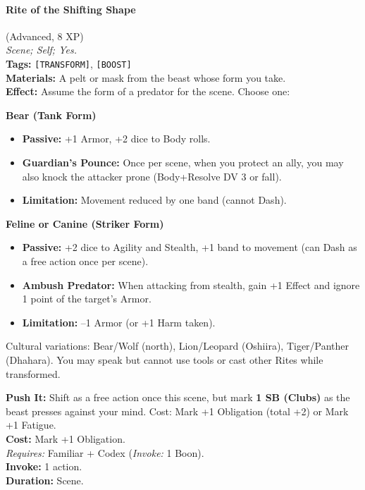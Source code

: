 \paragraph{Rite of the Shifting Shape} (Advanced, 8 XP) \hfill \\
\emph{Scene; Self; Yes.} \\
\textbf{Tags:} \texttt{[TRANSFORM]}, \texttt{[BOOST]} \\
\textbf{Materials:} A pelt or mask from the beast whose form you take. \\
\textbf{Effect:} Assume the form of a predator for the scene. Choose one:

\medskip
\noindent\textbf{Bear (Tank Form)}
\begin{itemize}
  \item \textbf{Passive:} +1 Armor, +2 dice to Body rolls.
  \item \textbf{Guardian's Pounce:} Once per scene, when you protect an ally, you may also knock the attacker prone (Body+Resolve DV 3 or fall).
  \item \textbf{Limitation:} Movement reduced by one band (cannot Dash).
\end{itemize}

\noindent\textbf{Feline or Canine (Striker Form)}
\begin{itemize}
  \item \textbf{Passive:} +2 dice to Agility and Stealth, +1 band to movement (can Dash as a free action once per scene).
  \item \textbf{Ambush Predator:} When attacking from stealth, gain +1 Effect and ignore 1 point of the target's Armor.
  \item \textbf{Limitation:} --1 Armor (or +1 Harm taken).
\end{itemize}

Cultural variations: Bear/Wolf (north), Lion/Leopard (Oshiira), Tiger/Panther (Dhahara). You may speak but cannot use tools or cast other Rites while transformed.

\textbf{Push It:} Shift as a free action once this scene, but mark \textbf{1 SB (Clubs)} as the beast presses against your mind. Cost: Mark +1 Obligation (total +2) or Mark +1 Fatigue. \\
\textbf{Cost:} Mark +1 Obligation. \\
\textit{Requires:} Familiar + Codex (\textit{Invoke:} 1 Boon). \\
\textbf{Invoke:} 1 action. \\
\textbf{Duration:} Scene.

